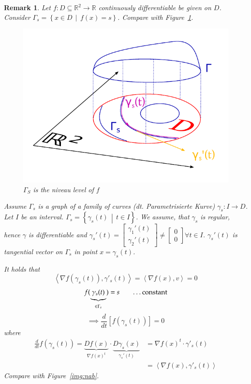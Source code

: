 \documentclass{article}
\newtheorem{remark}{Remark}  \numberwithin{remark}{section}
\newcommand{\setdef}[2]{\left\{\left.#1\,\middle|\,#2\right.\right\}}
\newcommand{\angel}[1]{\left\langle#1\right\rangle}
\begin{document}
\begin{remark}
  Let $f: D \subseteq \mathbb R^2 \to \mathbb R$ continuously differentiable be given on $D$.
  Consider $\Gamma_s = \setdef{x \in D}{f(x) = s}$. Compare with Figure~\ref{img:niveau}.

  \begin{figure}[!h]
    \begin{center}
      \includegraphics{img/32_niveau.pdf}
      \caption{$\Gamma_S$ is the niveau level of $f$}
      \label{img:niveau}
    \end{center}
  \end{figure}

  Assume $\Gamma_s$ is a graph of a family of curves (dt. \foreignlanguage{german}{Parametrisierte Kurve}) $\gamma_s: I \to D$.
  Let $I$ be an interval. $\Gamma_s = \setdef{\gamma_s(t)}{t \in I}$. We assume, that $\gamma_s$ is regular, hence $\gamma$ is differentiable
  and $\gamma_s'(t) = \begin{bmatrix} \gamma_1'(t) \\ \gamma_2'(t) \end{bmatrix} \neq \begin{bmatrix} 0 \\ 0 \end{bmatrix} \forall t \in I$.
  $\gamma_s'(t)$ is tangential vector on $\Gamma_s$ in point $x = \gamma_s(t)$.

  It holds that
  \[ \angel{\nabla f(\gamma_s(t)), \gamma'_s(t)} = \angel{\nabla f(x), v} = 0 \]
  \[ f(\underbrace{\gamma_s(t)}_{\in \Gamma_s}) = s \qquad \text{\dots constant} \]
  \[ \implies \frac{d}{dt} [f(\gamma_s(t))] = 0  \]
  where
  \begin{align*}
    \frac{d}{dt} f(\gamma_s(t))
      = \underbrace{D f(x)}_{\nabla f(x)^t} \cdot \underbrace{D \gamma_s(x)}_{\gamma_s'(t)}
      &= \nabla f(x)^t \cdot \gamma'_s(t) \\
      &= \angel{\nabla f(x), \gamma'_s(t)}
  \end{align*}
  Compare with Figure~\ref{img:nab}.


\end{remark}
\end{document}
